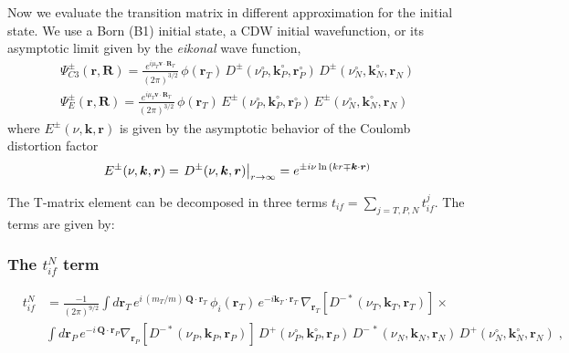 Now we evaluate the transition matrix in different approximation for
the initial state. We use a Born (B1) initial state, a CDW initial
wavefunction, or its asymptotic limit given by the \emph{eikonal} wave
function,
\begin{eqnarray} \label{Q:wf-i}
\Psi^{\pm}_{C3} (\bm{r},\bm{R}) = \frac{e^{i \mu_{T} \bm{v} \cdot
\bm{R}_T}} {(2 \pi)^{3/2}} \, \phi(\bm{r}_T) \,
D^{\pm}(\nu^{\circ}_P,\bm{k}_{P}^{\circ},\bm{r}_{P}^{\circ})
\,D^{\pm}(\nu_{N}^{\circ},\bm{k}_{N}^{\circ},\bm{r}_N)  \\
\Psi^{\pm}_{E} (\bm{r},\bm{R}) = \frac{e^{i \mu_{T} \bm{v} \cdot
\bm{R}_T}} {(2 \pi)^{3/2}} \, \phi(\bm{r}_T) \,
E^{\pm}(\nu^{\circ}_P,\bm{k}_{P}^{\circ},\bm{r}_{P}^{\circ})
\,E^{\pm}(\nu_{N}^{\circ},\bm{k}_{N}^{\circ},\bm{r}_N)
\end{eqnarray}
%
where $E^{\pm}(\nu,\bm{k},\bm{r})$ is given by the asymptotic behavior of
the Coulomb distortion factor
\begin{equation} \label{Q:Eikonal-wf}
E^{\pm}(\nu,\bm{k},\bm{r}) = \left. D^{\pm}(\nu,\bm{k},\bm{r}) \vstretch
\right|_{r \to \infty} = e^{{\pm} i \nu \ln{\left( kr \mp \bm{k}\cdot
\bm{r} \right)}}
\end{equation}


The T-matrix element can be decomposed in three terms $t_{if}=
\sum_{j=T,P,N} t^{j}_{if}$. The terms are given by:

\subsubsection{The $t^{N}_{if}$ term}
%
\begin{eqnarray} \label{Q:tifN1}
&t^{N}_{if}&\!\!= \frac{-1}{(2 \pi)^{9/2}}  \int d \bm{r}_{T} \,
  e^{i \, (m_{T}/m) \, \bm{Q} \cdot \bm{r}_T}
\, \phi_{i}(\bm{r}_T) \, e^{-i \bm{k}_{T} \cdot \bm{r}_T}
\,\nabla_{\bm{r}_{T}}\left[ D^{-*}(\nu_{T},\bm{k}_{T},\bm{r}_T) \right]
{\times}
\\
&& \int d \bm{r}_{P} \,
   e^{- i \, \bm{Q} \cdot \bm{r}_{P}}
\nabla_{\bm{r}_{P}}\left[ D^{-*}(\nu_{P},\bm{k}_{P},\bm{r}_{P}) \right]
\, D^{+}(\nu_{P}^{\circ},\bm{k}_{P}^{\circ},\bm{r}_{P}) \, D^{-\,\ast}(\nu_{N},
\bm{k}_{N}, \bm{r}_{N} ) \, D^{+}(\nu_{N}^{\circ},\bm{k}_{N}^{\circ},\bm{r}_{N})\;
,\nonumber
\end{eqnarray}

